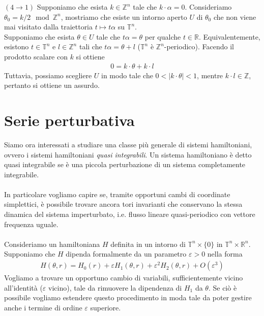 \documentclass[twoside, 11pt]{amsbook}
\makeatletter
\newcommand{\0}{{(0)}}
\newcommand{\3}{{(3)}}
\theoremstyle{colonplain}
\theoremstyle{colondefinition}
\theoremstyle{colonremark}
\numberwithin{equation}{chapter}
\renewcommand{\proofname}{Dimostrazione}
\renewenvironment{proof}[1][\proofname]{\par
  \pushQED{\qed}%
  \normalfont \topsep6\p@\@plus6\p@\relax
  \trivlist
  \item[\hskip\labelsep\bfseries #1:]\ignorespaces
}{%
  \popQED\endtrivlist\@endpefalse
}
\makeatother
\begin{document}
\begin{proof}
$(4 \rightarrow 1)$ Supponiamo che esista $k \in \mathbb{Z}^n$ tale che $k \cdot \alpha = 0$. Consideriamo $\theta_0 = k/2\mod\mathbb{Z}^n$, mostriamo che esiste un intorno aperto $U$ di $\theta_0$ che non viene mai visitato dalla traiettoria $t \mapsto t\alpha$ su $\mathbb{T}^n$. \\
Supponiamo che esista $\theta \in U$ tale che $t\alpha = \theta$ per qualche $t \in \mathbb{R}$. Equivalentemente, esistono $t \in \mathbb{T}^n$ e $l \in \mathbb{Z}^n$ tali che $t\alpha = \theta + l$ ($\mathbb{T}^n$ è $\mathbb{Z}^n$-periodico). Facendo il prodotto scalare con $k$ si ottiene
\begin{align}
    0 = k \cdot \theta + k \cdot l
\end{align}
Tuttavia, possiamo scegliere $U$ in modo tale che $0 < |k \cdot \theta| < 1$, mentre $k \cdot l \in \mathbb{Z}$, pertanto si ottiene un assurdo.
\end{proof}

\section{Serie perturbativa}
Siamo ora interessati a studiare una classe più generale di sistemi hamiltoniani, ovvero i sistemi hamiltoniani \textit{quasi integrabili}. Un sistema hamiltoniano è detto quasi integrabile se è una piccola perturbazione di un sistema completamente integrabile. \\ \\
In particolare vogliamo capire se, tramite opportuni cambi di coordinate simplettici, è possibile trovare ancora tori invarianti che conservano la stessa dinamica del sistema imperturbato, i.e. flusso lineare quasi-periodico con vettore frequenza uguale. \\ \\
Consideriamo un hamiltoniana $H$ definita in un intorno di $\mathbb{T}^n \times \{0\}$ in $\mathbb{T}^n \times \mathbb{R}^n$. Supponiamo che $H$ dipenda formalmente da un parametro $\varepsilon > 0$ nella forma
\begin{align}\label{PertSeries}
    H(\theta, r) = H_0(r) + \varepsilon H_1(\theta, r) + \varepsilon^2H_2(\theta, r) + O(\varepsilon^3) 
\end{align}
Vogliamo a trovare un opportuno cambio di variabili, sufficientemente vicino all'identità ($\varepsilon$ vicino), tale da rimuovere la dipendenza di $H_1$ da $\theta$. Se ciò è possibile vogliamo estendere questo procedimento in moda tale da poter gestire anche i termine di ordine $\varepsilon$ superiore.
\end{document}
